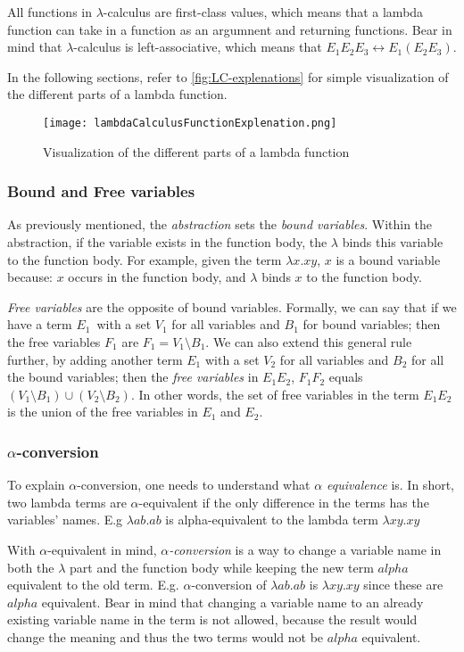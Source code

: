 \para
All functions in $\lambda$-calculus are first-class values, which means that a lambda function can take in a function as an argumnent and returning functions. Bear in mind that $\lambda$-calculus is left-associative, which means that $E_1 E_2 E_3 \leftrightarrow E_1 (E_2 E_3)$.

\para
In the following sections, refer to \autoref{fig:LC-explenations} for simple visualization of the different parts of a lambda function. 
\begin{figure}
    \centering
    \texttt{[image: lambdaCalculusFunctionExplenation.png]}
    \caption{Visualization of the different parts of a lambda function}
    \label{fig:LC-explenations}
\end{figure}

\subsubsection{Bound and Free variables}
As previously mentioned, the \emph{abstraction} sets the \emph{bound variables}. Within the abstraction, if the variable exists in the function body, the $\lambda$ binds this variable to the function body. For example, given the term $\lambda x.xy$, $x$ is a bound variable because: $x$ occurs in the function body, and $\lambda$ binds $x$ to the function body.

\para
\emph{Free variables} are the opposite of bound variables. Formally, we can say that if we have a term $E_1$ with a set $V_1$ for all variables and $B_1$ for bound variables; 
then the free variables $F_1$ are $F_1 = V_1\setminus B_1$. We can also extend this general rule further, 
by adding another term $E_1$ with a set $V_2$ for all variables and $B_2 $ for all the bound variables;
then the \emph{free variables} in $E_1 E_2$, $F_1 F_2$ equals $ (V_1\setminus B_1) \cup (V_2\setminus B_2)$. 
In other words, the set of free variables in the term $E_1 E_2$ is the union of the free variables in $E_1$ and $E_2$.

\subsubsection{$\alpha$-conversion}
To explain $\alpha$-conversion, one needs to understand what \emph{$\alpha$ equivalence} is. In short, two lambda terms are $\alpha$-equivalent if the only difference in the terms has the variables' names. E.g $\lambda ab.ab$ is alpha-equivalent to the lambda term $\lambda xy.xy$ 

\para
With $\alpha$-equivalent in mind, \emph{$\alpha$-conversion} is a way to change a variable name in both the $\lambda$ part and the function body while keeping the new term $alpha$ equivalent to the old term. E.g. $\alpha$-conversion of $\lambda ab.ab$ is $\lambda xy.xy$ since these are $alpha$ equivalent. Bear in mind that changing a variable name to an already existing variable name in the term is not allowed, because the result would change the meaning and thus the two terms would not be $alpha$ equivalent.

